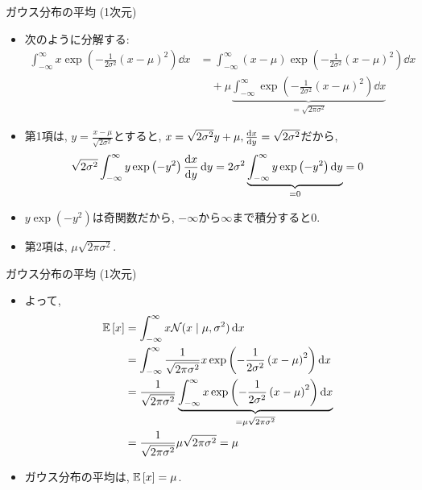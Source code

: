 \documentclass[dvipdfmx,notheorems,t]{beamer}
\begin{document}
\begin{frame}{ガウス分布の平均 (1次元)}
\begin{itemize}
  \item 次のように分解する:
  {\small \begin{align*}
    \int_{-\infty}^\infty x \exp
      \left( -\frac{1}{2 \sigma^2} \left( x - \mu \right)^2 \right) \dd{x}
      &= \int_{-\infty}^\infty (x - \mu) \exp
        \left( -\frac{1}{2 \sigma^2} \left( x - \mu \right)^2 \right) \dd{x} \\
      & \quad + \mu \underbrace{\int_{-\infty}^\infty \exp
        \left( -\frac{1}{2 \sigma^2} \left( x - \mu \right)^2 \right) \dd{x}}_{= \sqrt{2 \pi \sigma^2}}
  \end{align*}}
  \item 第1項は, $y = \frac{x - \mu}{\sqrt{2 \sigma^2}}$とすると,
  $x = \sqrt{2 \sigma^2} y + \mu, \dv{x}{y} = \sqrt{2 \sigma^2}$だから,
  \begin{align*}
    \sqrt{2 \sigma^2} \int_{-\infty}^\infty y \exp \left( -y^2 \right) \dv{x}{y} \dd{y}
      = 2 \sigma^2 \underbrace{\int_{-\infty}^\infty y \exp \left( -y^2 \right) \dd{y}}_{= 0}
      = 0
  \end{align*}
  \item $y \exp \left( -y^2 \right)$は奇関数だから, $-\infty$から$\infty$まで積分すると$0$.
  \item 第2項は, $\mu \sqrt{2 \pi \sigma^2}$.
\end{itemize}
\end{frame}

\begin{frame}{ガウス分布の平均 (1次元)}
\begin{itemize}
  \item よって,
  \begin{align*}
    \operatorname{\mathbb{E}} \left[ x \right] &= \int_{-\infty}^\infty x \mathcal{N}(x \mid \mu, \sigma^2) \dd{x} \\
      &= \int_{-\infty}^\infty \frac{1}{\sqrt{2 \pi \sigma^2}} x
        \exp \left( -\frac{1}{2 \sigma^2} \left( x - \mu \right)^2 \right) \dd{x} \\
      &= \frac{1}{\sqrt{2 \pi \sigma^2}} \underbrace{\int_{-\infty}^\infty x
        \exp \left( -\frac{1}{2 \sigma^2} \left( x - \mu \right)^2 \right) \dd{x}}_{= \mu \sqrt{2 \pi \sigma^2}} \\
      &= \frac{1}{\sqrt{2 \pi \sigma^2}} \mu \sqrt{2 \pi \sigma^2}
      = \mu
  \end{align*}
  \item ガウス分布の平均は, $\operatorname{\mathbb{E}} \left[ x \right] = \mu$.
\end{itemize}
\end{frame}
\end{document}
